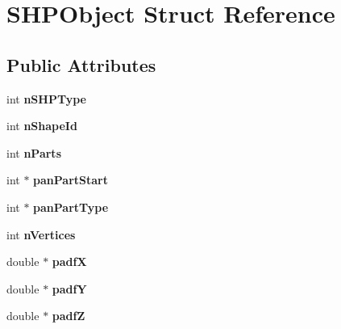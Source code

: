 \hypertarget{structSHPObject}{\section{S\-H\-P\-Object Struct Reference}
\label{structSHPObject}
}
\subsection*{Public Attributes}
\begin{DoxyCompactItemize}
\item 
\hypertarget{structSHPObject_a75081a4106a2b9f0350ed706437ed5f9}{int {\bfseries n\-S\-H\-P\-Type}}\label{structSHPObject_a75081a4106a2b9f0350ed706437ed5f9}

\item 
\hypertarget{structSHPObject_a4e7797860f2abd0b9c724900698d400e}{int {\bfseries n\-Shape\-Id}}\label{structSHPObject_a4e7797860f2abd0b9c724900698d400e}

\item 
\hypertarget{structSHPObject_ad2972dae3ea696223402aeae6d8958df}{int {\bfseries n\-Parts}}\label{structSHPObject_ad2972dae3ea696223402aeae6d8958df}

\item 
\hypertarget{structSHPObject_a6ac39a82a8d0b2ff4c467786374a835d}{int $\ast$ {\bfseries pan\-Part\-Start}}\label{structSHPObject_a6ac39a82a8d0b2ff4c467786374a835d}

\item 
\hypertarget{structSHPObject_a0c538132c32c672a88fb7c85bb03ee21}{int $\ast$ {\bfseries pan\-Part\-Type}}\label{structSHPObject_a0c538132c32c672a88fb7c85bb03ee21}

\item 
\hypertarget{structSHPObject_a77c4de0b4b1d7d4c4679ffd9111c2321}{int {\bfseries n\-Vertices}}\label{structSHPObject_a77c4de0b4b1d7d4c4679ffd9111c2321}

\item 
\hypertarget{structSHPObject_acbebd6e0c685c2f4ef58ec82f5ea9d89}{double $\ast$ {\bfseries padf\-X}}\label{structSHPObject_acbebd6e0c685c2f4ef58ec82f5ea9d89}

\item 
\hypertarget{structSHPObject_ae8dbc0c9fba282763ede2f704dba05ca}{double $\ast$ {\bfseries padf\-Y}}\label{structSHPObject_ae8dbc0c9fba282763ede2f704dba05ca}

\item 
\hypertarget{structSHPObject_ab9604c917c35dab02bec349fd11eaf7c}{double $\ast$ {\bfseries padf\-Z}}\label{structSHPObject_ab9604c917c35dab02bec349fd11eaf7c}


\end{DoxyCompactItemize}
